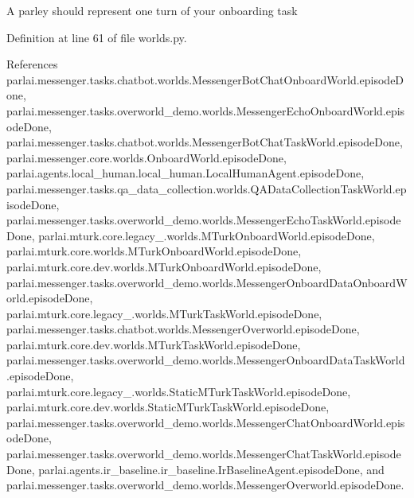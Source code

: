 \begin{DoxyVerb}A parley should represent one turn of your onboarding task\end{DoxyVerb}
 

Definition at line 61 of file worlds.\+py.



References parlai.\+messenger.\+tasks.\+chatbot.\+worlds.\+Messenger\+Bot\+Chat\+Onboard\+World.\+episode\+Done, parlai.\+messenger.\+tasks.\+overworld\+\_\+demo.\+worlds.\+Messenger\+Echo\+Onboard\+World.\+episode\+Done, parlai.\+messenger.\+tasks.\+chatbot.\+worlds.\+Messenger\+Bot\+Chat\+Task\+World.\+episode\+Done, parlai.\+messenger.\+core.\+worlds.\+Onboard\+World.\+episode\+Done, parlai.\+agents.\+local\+\_\+human.\+local\+\_\+human.\+Local\+Human\+Agent.\+episode\+Done, parlai.\+messenger.\+tasks.\+qa\+\_\+data\+\_\+collection.\+worlds.\+Q\+A\+Data\+Collection\+Task\+World.\+episode\+Done, parlai.\+messenger.\+tasks.\+overworld\+\_\+demo.\+worlds.\+Messenger\+Echo\+Task\+World.\+episode\+Done, parlai.\+mturk.\+core.\+legacy\+\_.\+worlds.\+M\+Turk\+Onboard\+World.\+episode\+Done, parlai.\+mturk.\+core.\+worlds.\+M\+Turk\+Onboard\+World.\+episode\+Done, parlai.\+mturk.\+core.\+dev.\+worlds.\+M\+Turk\+Onboard\+World.\+episode\+Done, parlai.\+messenger.\+tasks.\+overworld\+\_\+demo.\+worlds.\+Messenger\+Onboard\+Data\+Onboard\+World.\+episode\+Done, parlai.\+mturk.\+core.\+legacy\+\_.\+worlds.\+M\+Turk\+Task\+World.\+episode\+Done, parlai.\+messenger.\+tasks.\+chatbot.\+worlds.\+Messenger\+Overworld.\+episode\+Done, parlai.\+mturk.\+core.\+dev.\+worlds.\+M\+Turk\+Task\+World.\+episode\+Done, parlai.\+messenger.\+tasks.\+overworld\+\_\+demo.\+worlds.\+Messenger\+Onboard\+Data\+Task\+World.\+episode\+Done, parlai.\+mturk.\+core.\+legacy\+\_.\+worlds.\+Static\+M\+Turk\+Task\+World.\+episode\+Done, parlai.\+mturk.\+core.\+dev.\+worlds.\+Static\+M\+Turk\+Task\+World.\+episode\+Done, parlai.\+messenger.\+tasks.\+overworld\+\_\+demo.\+worlds.\+Messenger\+Chat\+Onboard\+World.\+episode\+Done, parlai.\+messenger.\+tasks.\+overworld\+\_\+demo.\+worlds.\+Messenger\+Chat\+Task\+World.\+episode\+Done, parlai.\+agents.\+ir\+\_\+baseline.\+ir\+\_\+baseline.\+Ir\+Baseline\+Agent.\+episode\+Done, and parlai.\+messenger.\+tasks.\+overworld\+\_\+demo.\+worlds.\+Messenger\+Overworld.\+episode\+Done.

\mbox{\label{classparlai_1_1mturk_1_1core_1_1worlds_1_1MTurkOnboardWorld_abf47662333aebdff9d3e2224e0f0a2bc}} 
